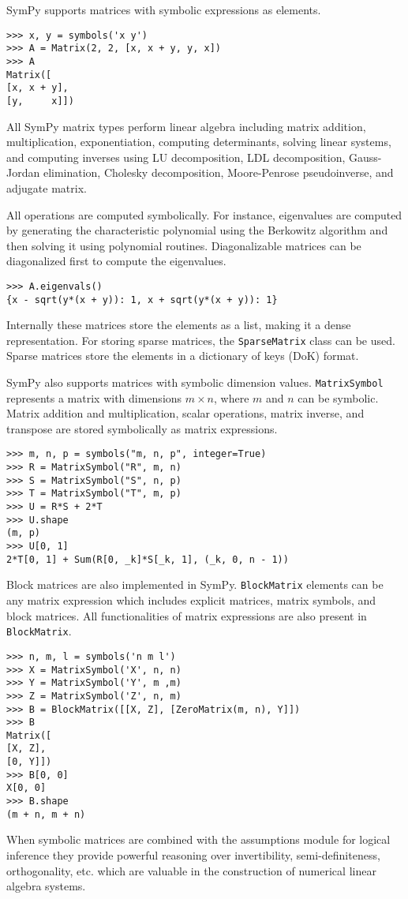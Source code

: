 SymPy supports matrices with symbolic expressions as elements.

\begin{verbatim}
>>> x, y = symbols('x y')
>>> A = Matrix(2, 2, [x, x + y, y, x])
>>> A
Matrix([
[x, x + y],
[y,     x]])
\end{verbatim}

All SymPy matrix types perform linear algebra including matrix addition,
multiplication, exponentiation, computing determinants, solving linear systems,
and computing inverses using LU decomposition, LDL decomposition, Gauss-Jordan
elimination, Cholesky decomposition, Moore-Penrose pseudoinverse, and adjugate
matrix.

All operations are computed symbolically. For instance, eigenvalues are computed
by generating the characteristic polynomial using the Berkowitz algorithm and
then solving it using polynomial routines. Diagonalizable matrices can be
diagonalized first to compute the eigenvalues.

\begin{verbatim}
>>> A.eigenvals()
{x - sqrt(y*(x + y)): 1, x + sqrt(y*(x + y)): 1}
\end{verbatim}

Internally these matrices store the elements as a list, making it a dense
representation. For storing sparse matrices, the \verb|SparseMatrix| class can
be used. Sparse matrices store the elements in a dictionary of keys (DoK)
format.

SymPy also supports matrices with symbolic dimension values. \verb|MatrixSymbol|
represents a matrix with dimensions $m\times n$, where $m$ and $n$ can be
symbolic. Matrix addition and multiplication, scalar operations, matrix inverse,
and transpose are stored symbolically as matrix expressions.

\begin{verbatim}
>>> m, n, p = symbols("m, n, p", integer=True)
>>> R = MatrixSymbol("R", m, n)
>>> S = MatrixSymbol("S", n, p)
>>> T = MatrixSymbol("T", m, p)
>>> U = R*S + 2*T
>>> U.shape
(m, p)
>>> U[0, 1]
2*T[0, 1] + Sum(R[0, _k]*S[_k, 1], (_k, 0, n - 1))
\end{verbatim}

Block matrices are also implemented in SymPy. \verb|BlockMatrix| elements can be any
matrix expression which includes explicit matrices, matrix symbols, and block
matrices. All functionalities of matrix expressions are also present in
\verb|BlockMatrix|.

\begin{verbatim}
>>> n, m, l = symbols('n m l')
>>> X = MatrixSymbol('X', n, n)
>>> Y = MatrixSymbol('Y', m ,m)
>>> Z = MatrixSymbol('Z', n, m)
>>> B = BlockMatrix([[X, Z], [ZeroMatrix(m, n), Y]])
>>> B
Matrix([
[X, Z],
[0, Y]])
>>> B[0, 0]
X[0, 0]
>>> B.shape
(m + n, m + n)
\end{verbatim}

When symbolic matrices are combined with the assumptions module for logical
inference they provide powerful reasoning over invertibility,
semi-definiteness, orthogonality, etc. which are valuable in the construction
of numerical linear algebra systems.

